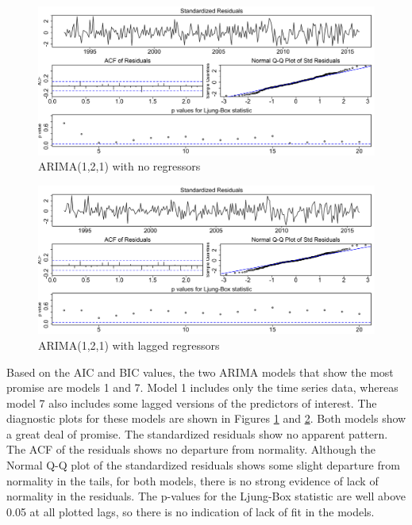 \documentclass[twoside,twocolumn]{article}
\begin{document}
		    \begin{figure}[htb]
    	\centering
    	\caption{Model 1: Residual diagnostics}
     	\includegraphics[width=\linewidth]{images/sarima1}
     	\caption*{ARIMA(1,2,1) with no regressors}
     	\label{fig:sarimamod1}
     \end{figure}


    \begin{figure}[htb]
    	\centering
    	\caption{Model 7: Residual diagnostics}
     	\includegraphics[width=\linewidth]{images/sarima7}
     	\caption*{ARIMA(1,2,1) with lagged regressors}
     	\label{fig:sarimamod7}
     \end{figure}



		Based on the AIC and BIC values, the two ARIMA models that show the most promise are models 1 and 7.  Model 1 includes only the time series data, whereas model 7 also includes some lagged versions of the predictors of interest.  The diagnostic plots for these models are shown in Figures \ref{fig:sarimamod1} and \ref{fig:sarimamod7}. Both models show a great deal of promise.  The standardized residuals show no apparent pattern. The ACF of the residuals shows no departure from normality. Although the Normal Q-Q plot of the standardized residuals shows some slight departure from normality in the tails, for both models, there is no strong evidence of lack of normality in the residuals.  The p-values for the  Ljung-Box statistic are well above 0.05 at all plotted lags, so there is no indication of lack of fit in the models.
\end{document}
